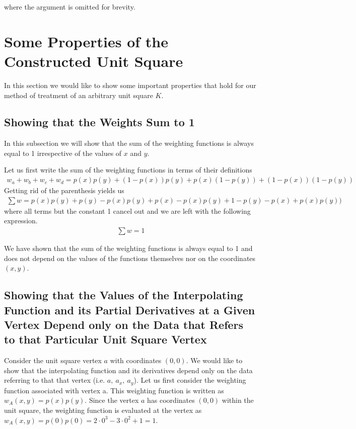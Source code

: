 \documentclass[fleqn]{article}
\begin{document}
where the argument is omitted for brevity.

\section{Some Properties of the Constructed Unit Square}

In this section we would like to show some important properties that hold for our method of treatment of an arbitrary unit square $K$.

\subsection{Showing that the Weights Sum to 1}

In this subsection we will show that the sum of the weighting functions is always equal to 1 irrespective of the values of $x$ and $y$.

Let us first write the sum of the weighting functions in terms of their definitions
\begin{align*}
w_{a} + w_{b} + w_{c} + w_{d} = p(x)p(y) + (1 - p(x))p(y) + p(x)(1 - p(y)) + (1 - p(x))(1 - p(y))
\end{align*}
Getting rid of the parenthesis yields us
\begin{align*}
\sum w = p(x)p(y) + p(y) - p(x)p(y) + p(x) - p(x)p(y) + 1 - p(y) - p(x) + p(x)p(y))
\end{align*}
where all terms but the constant 1 cancel out and we are left with the following expression.
\begin{align*}
\sum w = 1
\end{align*}

We have shown that the sum of the weighting functions is always equal to 1 and does not depend on the values of the functions themselves nor on the coordinates $(x, y)$.

\subsection{Showing that the Values of the Interpolating Function and its Partial Derivatives at a Given Vertex Depend only on the Data that Refers to that Particular Unit Square Vertex}

Consider the unit square vertex $a$ with coordinates $(0, 0)$. We would like to show that the interpolating function and its derivatives depend only on the data referring to that that vertex (i.e. $a, \ a_{x}, \ a_{y}$). Let us first consider the weighting function associated with vertex a. This weighting function is written as $w_{A}(x, y) = p(x)p(y)$. Since the vertex $a$ has coordinates $(0, 0)$ within the unit square, the weighting function is evaluated at the vertex as $w_{A}(x, y) = p(0)p(0) = 2 \cdot 0^3 - 3 \cdot 0^2 + 1 =  1$.
\end{document}
